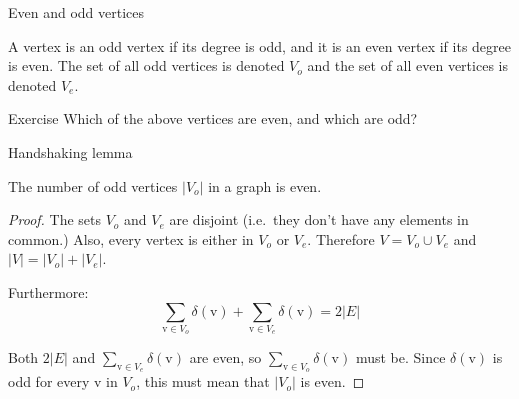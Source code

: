 \begin{frame}{Even and odd vertices}
  \vspace{-4mm}
  \begin{definition}
    A vertex is an odd vertex if its degree is odd, and it is an even vertex if its degree is even.
    The set of all odd vertices is denoted $V_o$ and the set of all even vertices is denoted $V_e$.
  \end{definition}
  \begin{center}
  \end{center}
  \begin{block}{Exercise}
    Which of the above vertices are even, and which are odd?
  \end{block}
\end{frame}

\begin{frame}{Handshaking lemma}

  \begin{lemma}
    The number of odd vertices $| V_o |$ in a graph is even.
  \end{lemma}

  \begin{proof}
    The sets $V_o$ and $V_e$ are disjoint (i.e.\ they don't have any elements in common.)
    Also, every vertex is either in $V_o$ or $V_e$.
    Therefore $V = V_o \cup V_e$ and $|V| = |V_o| + |V_e|$.
    
    Furthermore:
      \[ \sum_{\mathrm{v} \in V_o} \delta(\mathrm{v}) + \sum_{\mathrm{v} \in V_e} \delta(\mathrm{v}) = 2 |E| \]

    Both $2|E|$ and $\sum_{\mathrm{v} \in V_e} \delta(\mathrm{v})$ are even, so $\sum_{\mathrm{v} \in V_o} \delta(\mathrm{v})$ must be.
    Since $\delta(\mathrm{v})$ is odd for every $\mathrm{v}$ in $V_o$, this must mean that $|V_o|$ is even.
  \end{proof}

\end{frame}



